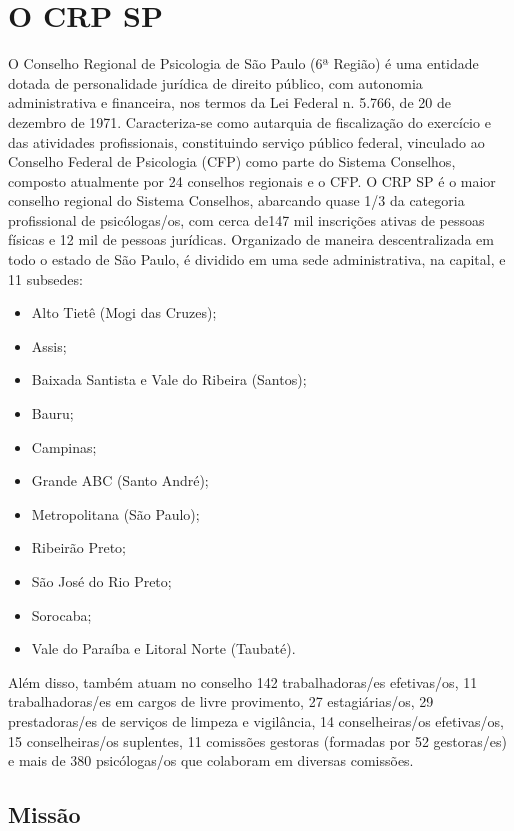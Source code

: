 \chapter{O CRP SP}

O Conselho Regional de Psicologia de São Paulo (6ª Região) é uma entidade dotada de personalidade jurídica de direito público, com autonomia administrativa e financeira, nos termos da Lei Federal n. 5.766, de 20 de dezembro de 1971. Caracteriza-se como autarquia de fiscalização do exercício e das atividades profissionais, constituindo serviço público federal, vinculado ao Conselho Federal de Psicologia (CFP) como parte do Sistema Conselhos, composto atualmente por 24 conselhos regionais e o CFP.
O CRP SP é o maior conselho regional do Sistema Conselhos, abarcando quase 1/3 da categoria profissional de psicólogas/os, com cerca de147 mil inscrições ativas de pessoas físicas e 12 mil de pessoas jurídicas. Organizado de maneira descentralizada em todo o estado de São Paulo, é dividido em uma sede administrativa, na capital, e 11 subsedes:

\begin{itemize}
    \item Alto Tietê (Mogi das Cruzes);
    \item Assis;
    \item Baixada Santista e Vale do Ribeira (Santos);
    \item Bauru;
    \item Campinas;
    \item Grande ABC (Santo André);
    \item Metropolitana (São Paulo);
    \item Ribeirão Preto;
    \item São José do Rio Preto;
    \item Sorocaba;
    \item Vale do Paraíba e Litoral Norte (Taubaté).
\end{itemize}

Além disso, também atuam no conselho 142 trabalhadoras/es efetivas/os, 11 trabalhadoras/es em cargos de livre provimento, 27 estagiárias/os, 29 prestadoras/es de serviços de limpeza e vigilância, 14 conselheiras/os efetivas/os, 15 conselheiras/os suplentes, 11 comissões gestoras (formadas por 52 gestoras/es) e mais de 380 psicólogas/os que colaboram em diversas comissões.

\section*{Missão}

